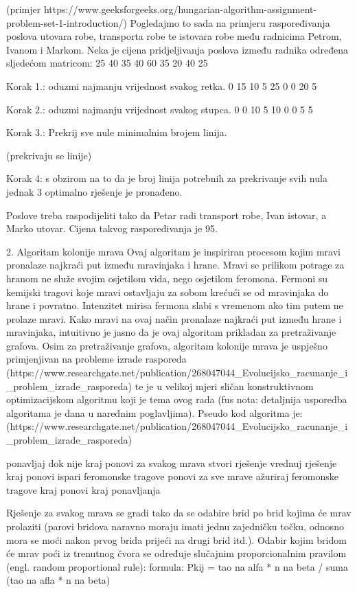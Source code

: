 (primjer https://www.geeksforgeeks.org/hungarian-algorithm-assignment-problem-set-1-introduction/)
Pogledajmo to sada na primjeru raspoređivanja poslova utovara robe, transporta robe te istovara robe među radnicima Petrom, Ivanom i Markom.
Neka je cijena pridjeljivanja poslova između radnika određena sljedećom matricom:
25 40 35
40 60 35
20 40 25

Korak 1.: oduzmi najmanju vrijednost svakog retka.
0 15 10
5 25 0
0 20 5

Korak 2.: oduzmi najmanju vrijednost svakog stupca.
0 0  10
5 10 0
0 5  5

Korak 3.: Prekrij sve nule minimalnim brojem linija.

(prekrivaju se linije)


Korak 4: s obzirom na to da je broj linija potrebnih za prekrivanje svih nula jednak 3 optimalno rješenje je pronađeno.

Poslove treba raspodijeliti tako da Petar radi transport robe, Ivan istovar, a Marko utovar. Cijena takvog raspoređivanja je 95.





2. Algoritam kolonije mrava
Ovaj algoritam je inspiriran procesom kojim mravi pronalaze najkraći put između mravinjaka i hrane. Mravi se prilikom potrage za hranom ne
služe svojim osjetilom vida, nego osjetilom feromona. Fermoni su kemijski tragovi koje mravi ostavljaju za sobom krećući se od
mravinjaka do hrane i povratno. Intenzitet mirisa fermona slabi s vremenom ako tim putem ne prolaze mravi. Kako mravi na ovaj način pronalaze
najkraći put između hrane i mravinjaka, intuitivno je jasno da je ovaj algoritam prikladan za pretraživanje grafova. Osim za pretraživanje grafova,
algoritam kolonije mrava je uspješno primjenjivan na probleme izrade rasporeda (https://www.researchgate.net/publication/268047044_Evolucijsko_racunanje_i_problem_izrade_rasporeda)
te je u velikoj mjeri sličan konstruktivnom optimizacijskom algoritmu koji je tema ovog rada (fus nota: detaljnija usporedba algoritama je dana u narednim poglavljima).
Pseudo kod algoritma je: (https://www.researchgate.net/publication/268047044_Evolucijsko_racunanje_i_problem_izrade_rasporeda)

ponavljaj dok nije kraj
  ponovi za svakog mrava
    stvori rješenje
    vrednuj rješenje
  kraj ponovi
  ispari feromonske tragove
  ponovi za sve mrave
      ažuriraj feromonske tragove
  kraj ponovi
kraj ponavljanja

Rješenje za svakog mrava se gradi tako da se odabire brid po brid kojima će mrav prolaziti (parovi bridova naravno moraju imati jednu
zajedničku točku, odnosno mora se moći nakon prvog brida prijeći na drugi brid itd.). Odabir kojim bridom će mrav poći iz trenutnog čvora
se određuje slučajnim proporcionalnim pravilom (engl. random proportional rule):
formula: Pkij = tao na alfa * n na beta / suma (tao na afla * n na beta)

